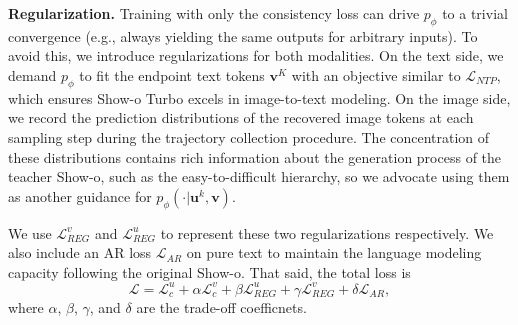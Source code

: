 \noindent \textbf{Regularization.}
Training with only the consistency loss can drive $p_\phi$ to a trivial convergence (e.g., always yielding the same outputs for arbitrary inputs). 
To avoid this, we introduce regularizations for both modalities. 
On the text side, we demand $p_\phi$ to fit the endpoint text tokens $\mathbf{v}^K$ with an objective similar to $\mathcal{L}_{NTP}$, which ensures Show-o Turbo excels in image-to-text modeling. 
On the image side, we record the prediction distributions of the recovered image tokens at each sampling step during the trajectory collection procedure.
The concentration of these distributions contains rich information about the generation process of the teacher Show-o, such as the easy-to-difficult hierarchy, so we advocate using them as another guidance for $p_\phi(\cdot|\mathbf{u}^k, \mathbf{v})$. 


We use $\mathcal{L}_{REG}^v$ and $\mathcal{L}_{REG}^u$ to represent these two regularizations respectively. 
We also include an AR loss $\mathcal{L}_{AR}$ on pure text to maintain the language modeling capacity following the original Show-o.
That said, the total loss is 
\begin{equation}
\mathcal{L} =\mathcal{L}_{c}^u + \alpha \mathcal{L}_{c}^v  +  \beta \mathcal{L}_{REG}^u + \gamma \mathcal{L}_{REG}^v+\delta \mathcal{L}_{AR},
\end{equation}
where $ \alpha $, $ \beta $, $ \gamma$, and $\delta$ are the trade-off coefficnets.

